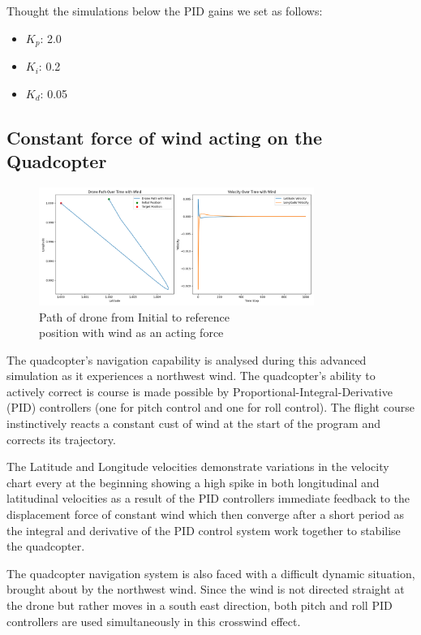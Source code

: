 \documentclass{report}
\begin{document}
Thought the simulations below the PID gains we set as follows: 

\begin{itemize}
  \item \(K_p\): 2.0
  \item \(K_i\): 0.2
  \item \(K_d\): 0.05
\end{itemize}

\subsection*{Constant force of wind acting on the Quadcopter}
\begin{figure}[H]
  \centering
  \includegraphics[width=0.8\textwidth]{Pictures/Drone_path_wind.png} 
  \caption{Path of drone from Initial to reference \\ position with wind as an acting force}
  \label{fig:Drone_path_wind}
\end{figure}
The quadcopter’s navigation capability is analysed during this advanced
simulation as it experiences a northwest wind. The quadcopter’s ability to
actively correct is course is made possible by Proportional-Integral-Derivative
(PID) controllers (one for pitch control and one for roll control). The flight
course instinctively reacts a constant cust of wind at the start of the program
and corrects its trajectory.

The Latitude and Longitude velocities demonstrate variations in the velocity
chart every at the beginning showing a high spike in both longitudinal and
latitudinal velocities as a result of the  PID controllers immediate feedback to
the displacement force of constant wind which then converge after a short period
as the integral and derivative of the PID control system work together to
stabilise the quadcopter.

The quadcopter navigation system is also faced with a difficult dynamic
situation, brought about by the northwest wind. Since the wind is not directed
straight at the drone but rather moves in a south east direction, both pitch and
roll PID controllers are used simultaneously in this crosswind effect. 
\end{document}
